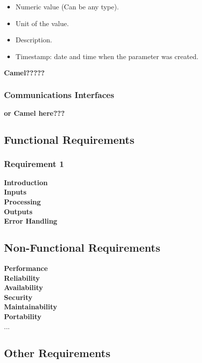 \begin{itemize}
\item Numeric value (Can be any type).
\item Unit of the value.
\item Description.
\item Timestamp: date and time when the parameter was created.

\end{itemize}


\textbf{Camel?????}

\subsubsection{Communications Interfaces}

\textbf{or Camel here???}


\subsection{Functional Requirements}

\subsubsection{Requirement 1}

\textbf{Introduction}\\
\textbf{Inputs}\\
\textbf{Processing}\\
\textbf{Outputs}\\
\textbf{Error Handling}\\

\subsection{Non-Functional Requirements}

\textbf{Performance}\\
\textbf{Reliability}\\
\textbf{Availability}\\
\textbf{Security}\\
\textbf{Maintainability}\\
\textbf{Portability}\\
...

\subsection{Other Requirements}

\newpage

